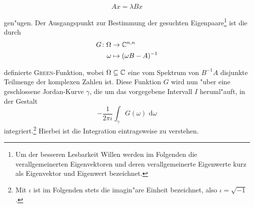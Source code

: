   \begin{equation}\label{eq:eigen} %
  Ax = \lambda Bx
  \end{equation}

gen"ugen. Der Ausgangspunkt zur Bestimmung der gesuchten Eigenpaare\footnote{Um der besseren Lesbarkeit Willen werden
im Folgenden die verallgemeinerten Eigenvektoren und deren verallgemeinerte
Eigenwerte kurz als Eigenvektor und Eigenwert bezeichnet.}
ist die durch%
  \begin{align*}
  G\colon\Omega &\to\mathbb{C}^{n,n}\\
  \omega &\mapsto (\omega B - A)^{-1}
  \end{align*}

definierte \textsc{Green}-Funktion, wobei $\Omega \subseteq \mathbb{C}$ eine vom Spektrum
von $B^{-1}A$ disjunkte Teilmenge der komplexen Zahlen ist.
Diese Funktion $G$ wird nun "uber eine geschlossene Jordan-Kurve $\gamma$,
die um das vorgegebene Intervall $I$ heruml"auft, in der Gestalt
\[
-\frac{1}{2\pi\iota}\int_\gamma G(\omega)\text{ d}\omega
\]
integriert.\footnote{Mit $\iota$ ist im Folgenden stets die imagin"are Einheit bezeichnet,
also $\iota = \sqrt{-1}$.} Hierbei ist die Integration eintragsweise zu verstehen.\\

